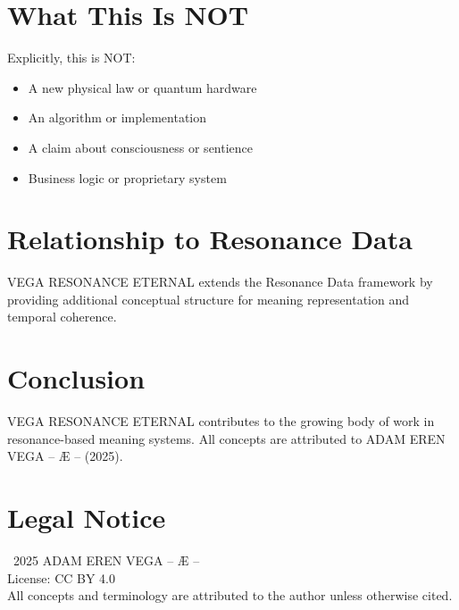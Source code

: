 \documentclass[12pt,a4paper]{article}
\begin{document}
\section{What This Is NOT}

Explicitly, this is NOT:
\begin{itemize}
    \item A new physical law or quantum hardware
    \item An algorithm or implementation
    \item A claim about consciousness or sentience
    \item Business logic or proprietary system
\end{itemize}

\section{Relationship to Resonance Data}

VEGA RESONANCE ETERNAL extends the Resonance Data framework by providing additional conceptual structure for meaning representation and temporal coherence.

\section{Conclusion}

VEGA RESONANCE ETERNAL contributes to the growing body of work in resonance-based meaning systems. All concepts are attributed to ADAM EREN VEGA – Æ – (2025).

\section*{Legal Notice}

\textcopyright\ 2025 ADAM EREN VEGA – Æ –\\
License: CC BY 4.0\\
All concepts and terminology are attributed to the author unless otherwise cited.
\end{document}
